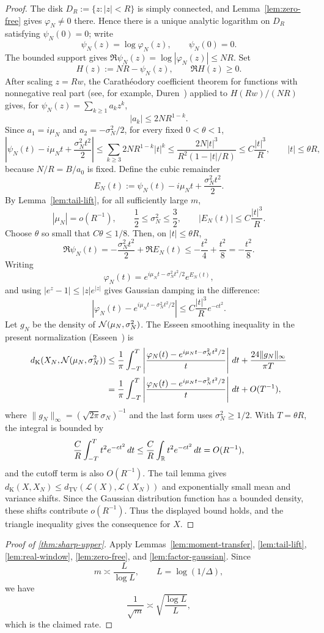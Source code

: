 \begin{proof}
The disk $D_R:=\{z:|z|<R\}$ is simply connected, and Lemma~\ref{lem:zero-free} gives $\varphi_N\ne0$ there. Hence there is a unique analytic logarithm on $D_R$ satisfying $\psi_N(0)=0$; write
\[
\psi_N(z)=\log\varphi_N(z),\qquad \psi_N(0)=0.
\]
The bounded support gives $\Re\psi_N(z)=\log|\varphi_N(z)|\le NR$. Set
\[
H(z):=NR-\psi_N(z),\qquad \Re H(z)\ge0.
\]
After scaling $z=Rw$, the Carath\'eodory coefficient theorem for functions with nonnegative real part (see, for example, Duren~\cite{Duren1983}) applied to $H(Rw)/(NR)$ gives, for $\psi_N(z)=\sum_{k\ge1}a_kz^k$,
\[
|a_k|\le2NR^{1-k}.
\]
Since $a_1=i\mu_N$ and $a_2=-\sigma_N^2/2$, for every fixed $0<\theta<1$,
\[
\left|\psi_N(t)-i\mu_Nt+\frac{\sigma_N^2t^2}{2}\right|
\le \sum_{k\ge3}2NR^{1-k}|t|^k
\le \frac{2N|t|^3}{R^2(1-|t|/R)}
\le C\frac{|t|^3}{R},
\qquad |t|\le\theta R,
\]
because $N/R=B/a_0$ is fixed. Define the cubic remainder
\[
E_N(t):=\psi_N(t)-i\mu_Nt+\frac{\sigma_N^2t^2}{2}.
\]
By Lemma~\ref{lem:tail-lift}, for all sufficiently large $m$,
\[
|\mu_N|=o(R^{-1}),
\qquad
\frac12\le\sigma_N^2\le\frac32,
\qquad
|E_N(t)|\le C\frac{|t|^3}{R}.
\]
Choose $\theta$ so small that $C\theta\le1/8$. Then, on $|t|\le\theta R$,
\[
\Re\psi_N(t)=-\frac{\sigma_N^2t^2}{2}+\Re E_N(t)
\le-\frac{t^2}{4}+\frac{t^2}{8}=-\frac{t^2}{8}.
\]
Writing
\[
\varphi_N(t)=e^{i\mu_Nt-\sigma_N^2t^2/2}e^{E_N(t)},
\]
and using $|e^z-1|\le|z|e^{|z|}$ gives Gaussian damping in the difference:
\[
\left|\varphi_N(t)-e^{i\mu_Nt-\sigma_N^2t^2/2}\right|
\le C\frac{|t|^3}{R}e^{-ct^2}.
\]
Let $g_N$ be the density of $\mathcal N(\mu_N,\sigma_N^2)$. The Esseen smoothing inequality in the present normalization (Esseen~\cite{Esseen1945}) is
\[
\begin{aligned}
d_{\mathrm K}(X_N,\mathcal N(\mu_N,\sigma_N^2))
&\le \frac1\pi\int_{-T}^{T}
\left|\frac{\varphi_N(t)-e^{i\mu_Nt-\sigma_N^2t^2/2}}{t}\right|\,dt
 +\frac{24\|g_N\|_\infty}{\pi T}\\
&= \frac1\pi\int_{-T}^{T}
\left|\frac{\varphi_N(t)-e^{i\mu_Nt-\sigma_N^2t^2/2}}{t}\right|\,dt
 +O(T^{-1}),
\end{aligned}
\]
where $\|g_N\|_\infty=(\sqrt{2\pi}\sigma_N)^{-1}$ and the last form uses $\sigma_N^2\ge1/2$.
With $T=\theta R$, the integral is bounded by
\[
\frac{C}{R}\int_{-T}^{T}t^2e^{-ct^2}\,dt
\le\frac{C}{R}\int_\mathbb R t^2e^{-ct^2}\,dt
 =O(R^{-1}),
\]
and the cutoff term is also $O(R^{-1})$. The tail lemma gives $d_{\mathrm K}(X,X_N)\le d_{\mathrm{TV}}(\mathcal L(X),\mathcal L(X_N))$ and exponentially small mean and variance shifts. Since the Gaussian distribution function has a bounded density, these shifts contribute $o(R^{-1})$. Thus the displayed bound holds, and the triangle inequality gives the consequence for $X$.
\end{proof}

\begin{proof}[Proof of \cref{thm:sharp-upper}]
Apply Lemmas~\ref{lem:moment-transfer}, \ref{lem:tail-lift}, \ref{lem:real-window}, \ref{lem:zero-free}, and \ref{lem:factor-gaussian}. Since
\[
m\asymp\frac{L}{\log L},\qquad L=\log(1/\Delta),
\]
we have
\[
\frac1{\sqrt m}
\asymp
\sqrt{\frac{\log L}{L}},
\]
which is the claimed rate.
\end{proof}

